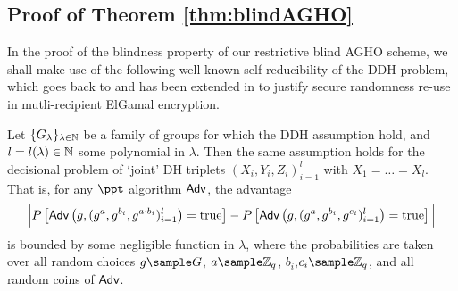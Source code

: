 

\subsection{Proof of Theorem \ref{thm:blindAGHO}}
\label{s:proofAGHO}

In the proof of the blindness property of our restrictive blind AGHO scheme, we shall make use of the following well-known self-reducibility of the DDH problem, which goes back to \cite{Stadler:1996} and has been extended in \cite{Bellare:2000} to justify secure randomness re-use in mutli-recipient ElGamal encryption.
\begin{lemma}
\label{lem:DDH}
Let $\{G_\lambda\}_{\lambda\in\operatorname{\mathbb{N}}}$ be a family of groups for which the DDH assumption hold, and   $l=l(\lambda)\in\operatorname{\mathbb{N}}$  some 
polynomial in $\lambda$.
Then the same assumption holds for the decisional problem of  `joint' DH triplets $(X_i,Y_i,Z_i)_{i=1}^l$ with $X_1=\ldots = X_l$.
That is, for any $\ppt$ algorithm $\mathsf{Adv}$, the advantage
\begin{equation*}
\Big| P\left[\mathsf{Adv}\left(g, (g^a, g^{b_i}, g^{a\cdot b_i})_{i=1}^l\right)= \text{true} \right]  
-
P\left[\mathsf{Adv}\left(g, (g^a, g^{b_i}, g^{c_i})_{i=1}^l\right)= \text{true} \right] \Big| 
\end{equation*}
is bounded by some negligible function in $\lambda$, where  
the probabilities are taken over all random choices $g\sample G$, $a\sample\Z_q$, $b_i$,$c_i\sample\Z_q$, and all random coins of $\mathsf{Adv}$.
\end{lemma}

